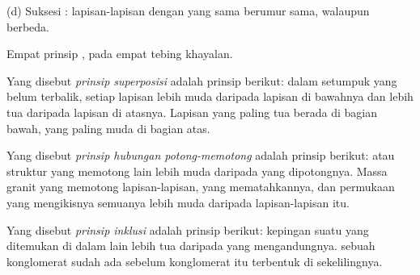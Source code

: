 \begin{omfigure}
\begin{minipage}[t]{0.49\linewidth}
{\small (d) Suksesi : lapisan-lapisan dengan  yang sama berumur
sama, walaupun  berbeda.}
\end{minipage}

\medskip
{\small Empat prinsip , pada empat tebing
khayalan.}
\label{fig:g7:geological-time:principles}
\end{omfigure}

\begin{definition}\label{def:g7:geological-time:superposition}
Yang disebut \emph{prinsip superposisi} adalah
prinsip berikut: dalam setumpuk  yang belum terbalik, setiap
lapisan lebih muda daripada lapisan di bawahnya dan lebih tua daripada
lapisan di atasnya. Lapisan yang paling tua berada di bagian bawah, yang
paling muda di bagian atas.
\end{definition}

\begin{definition}\label{def:g7:geological-time:cross-cutting}
Yang disebut \emph{prinsip hubungan potong-memotong} adalah prinsip berikut:  atau struktur yang memotong
 lain lebih muda daripada  yang dipotongnya. Massa granit yang
memotong lapisan-lapisan,  yang mematahkannya, dan permukaan 
yang mengikisnya semuanya lebih muda daripada lapisan-lapisan itu.
\end{definition}

\begin{definition}\label{def:g7:geological-time:inclusion}
Yang disebut \emph{prinsip inklusi} adalah prinsip
berikut: kepingan suatu  yang ditemukan di dalam  lain lebih
tua daripada  yang mengandungnya.  sebuah konglomerat
sudah ada sebelum konglomerat itu terbentuk di sekelilingnya.
\end{definition}

